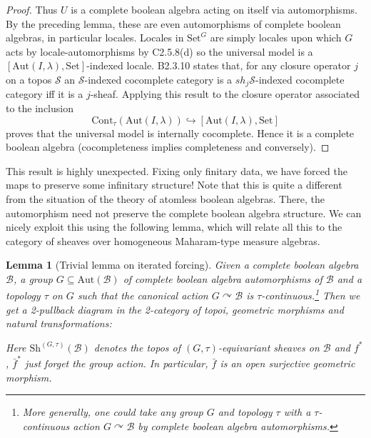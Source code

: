 \documentclass[a4paper]{amsproc}
\theoremstyle{plain}
\newtheorem{lemma}[theorem]{Lemma}
\theoremstyle{definition}
\theoremstyle{remark}
\numberwithin{equation}{section}
\begin{document}
\begin{proof}
\indent Thus $U$ is a complete boolean algebra acting on itself via automorphisms. By the preceding lemma, these are even automorphisms of complete boolean algebras, in particular locales. Locales in $\text{Set}^G$ are simply locales upon which $G$ acts by locale-automorphisms by C2.5.8(d) so the universal model is a  $[\text{Aut}(I,\lambda),\text{Set}]$-indexed locale. B2.3.10 states that, for any closure operator $j$ on a topos $\mathcal{S}$ an $\mathcal{S}$-indexed cocomplete category is a  $sh_j\mathcal{S}$-indexed cocomplete category iff it is a $j$-sheaf. Applying this result to the closure operator associated to the inclusion
\[\text{Cont}_\tau(\text{Aut}(I,\lambda))\hookrightarrow [\text{Aut}(I,\lambda),\text{Set}]\]
 proves that the universal model is internally cocomplete. Hence it is a complete boolean algebra (cocompleteness implies completeness and conversely).
\end{proof}
This result is highly unexpected. Fixing only finitary data, we have forced the maps to preserve some infinitary structure! Note that this is quite a different from the situation of the theory of atomless boolean algebras. There, the automorphism need not preserve the complete boolean algebra structure. We can nicely exploit this using the following lemma, which will relate all this to the category of sheaves over homogeneous Maharam-type measure algebras.
\begin{lemma}[Trivial lemma on iterated forcing] Given a complete boolean algebra $\mathcal{B}$, a group $G\subseteq \text{Aut}(\mathcal{B})$ of complete boolean algebra automorphisms of $\mathcal{B}$ and a topology $\tau$ on $G$ such that the canonical action $G\curvearrowright \mathcal{B}$ is $\tau$-continuous.\footnote{More generally, one could take any group $G$ and topology $\tau$ with a $\tau$-continuous action $G\curvearrowright \mathcal{B}$ by complete boolean algebra automorphisms.} Then we get a 2-pullback diagram in the 2-category of topoi, geometric morphisms and natural transformations:
\begin{center}
\end{center}
Here $\text{Sh}^{(G,\tau)}(\mathcal{B})$ denotes the topos of $(G,\tau)$-equivariant sheaves on $\mathcal{B}$ and $f^*$, $\bar{f}^*$ just forget the group action.\newline
\indent In particular, $\bar{f}$ is an open surjective geometric morphism.
\end{lemma}
\end{document}
